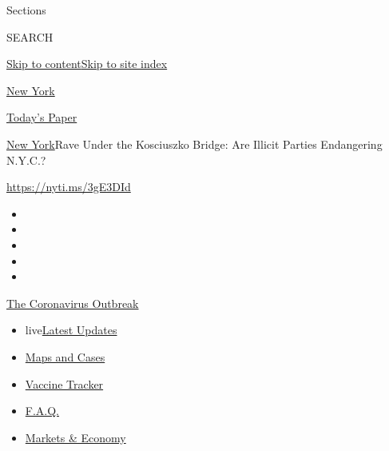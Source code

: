 Sections

SEARCH

\protect\hyperlink{site-content}{Skip to
content}\protect\hyperlink{site-index}{Skip to site index}

\href{https://www.nytimes.com/section/nyregion}{New York}

\href{https://myaccount.nytimes.com/auth/login?response_type=cookie\&client_id=vi}{}

\href{https://www.nytimes.com/section/todayspaper}{Today's Paper}

\href{/section/nyregion}{New York}\textbar{}Rave Under the Kosciuszko
Bridge: Are Illicit Parties Endangering N.Y.C.?

\href{https://nyti.ms/3gE3DId}{https://nyti.ms/3gE3DId}

\begin{itemize}
\item
\item
\item
\item
\item
\end{itemize}

\href{https://www.nytimes.com/news-event/coronavirus?action=click\&pgtype=Article\&state=default\&region=TOP_BANNER\&context=storylines_menu}{The
Coronavirus Outbreak}

\begin{itemize}
\tightlist
\item
  live\href{https://www.nytimes.com/2020/08/08/world/coronavirus-updates.html?action=click\&pgtype=Article\&state=default\&region=TOP_BANNER\&context=storylines_menu}{Latest
  Updates}
\item
  \href{https://www.nytimes.com/interactive/2020/us/coronavirus-us-cases.html?action=click\&pgtype=Article\&state=default\&region=TOP_BANNER\&context=storylines_menu}{Maps
  and Cases}
\item
  \href{https://www.nytimes.com/interactive/2020/science/coronavirus-vaccine-tracker.html?action=click\&pgtype=Article\&state=default\&region=TOP_BANNER\&context=storylines_menu}{Vaccine
  Tracker}
\item
  \href{https://www.nytimes.com/interactive/2020/world/coronavirus-tips-advice.html?action=click\&pgtype=Article\&state=default\&region=TOP_BANNER\&context=storylines_menu}{F.A.Q.}
\item
  \href{https://www.nytimes.com/live/2020/08/07/business/stock-market-today-coronavirus?action=click\&pgtype=Article\&state=default\&region=TOP_BANNER\&context=storylines_menu}{Markets
  \& Economy}
\end{itemize}

